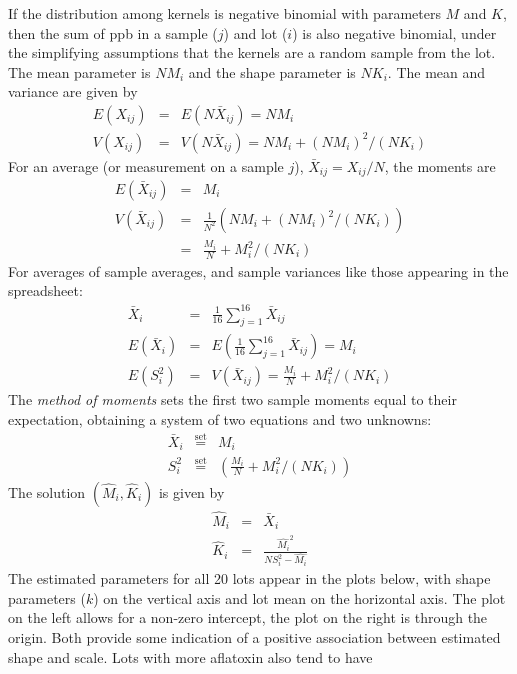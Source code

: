 \documentclass{article}
\begin{document}
If the distribution among kernels is negative binomial with parameters $M$ and $K$, then the sum of ppb in a sample ($j$) and lot ($i$)
is also negative binomial, under the simplifying assumptions that the kernels are a random sample from the lot.  The mean parameter is $NM_i$ and 
the shape parameter is $NK_i$.  The mean and variance
are given by
\begin{eqnarray*}
E(X_{ij}) &=& E(N\bar{X}_{ij}) = NM_i \\
V(X_{ij}) &=& V(N\bar{X}_{ij}) = NM_i + (NM_i)^2/(NK_i)
\end{eqnarray*}
For an average (or measurement on a sample $j$), $\bar{X}_{ij}=X_{ij}/N$, the moments are 
\begin{eqnarray*}
E(\bar{X}_{ij}) &=& M_i \\
V(\bar{X}_{ij}) &=& \frac{1}{N^2} (NM_i + (NM_i)^2/(NK_i)) \\
&=& \frac{M_i}{N} + M_i^2/(NK_i)
\end{eqnarray*}
For averages of sample averages, and sample variances like those appearing in the spreadsheet:
\begin{eqnarray*}
\bar{X}_{i} &=& \frac{1}{16} \sum_{j=1}^{16} \bar{X}_{ij} \\
E(\bar{X}_{i}) &=& E(\frac{1}{16} \sum_{j=1}^{16} \bar{X}_{ij}) = M_i \\
E(S_i^2) &=& V(\bar{X}_{ij}) = \frac{M_i}{N} + M_i^2/(NK_i)
\end{eqnarray*}
\newpage
The {\em method of moments} sets the first two sample moments equal to their 
expectation, obtaining a system of two equations and two unknowns:
\begin{eqnarray*}
\bar{X}_i & \stackrel{\mbox{set}}{=} & M_i  \\
S^2_i & \stackrel{\mbox{set}}{=} & \left(\frac{M_i}{N} + M_i^2/(NK_i)\right)
\end{eqnarray*}
The solution $(\hat{M}_i,\hat{K}_i)$ is given by 
\begin{eqnarray*}
\widehat{M}_i &=& \bar{X}_i \\
\widehat{K}_i &=& \frac{\widehat{M_i}^2}{NS_i^2 - \widehat{M_i}}
\end{eqnarray*}
The estimated parameters for all 20 lots appear in the plots below, with shape parameters ($k$) on the vertical axis and lot mean on the horizontal axis.  The plot on the left allows for a non-zero intercept, the plot on the right is through the origin.  Both provide some indication of a positive association between estimated shape and scale.  Lots with more aflatoxin also tend to have 
\end{document}
